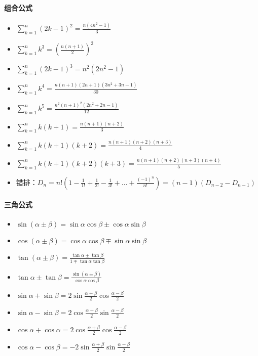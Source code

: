 \documentclass{article}
\begin{document}
\paragraph{组合公式}

\begin{itemize}
\item
  $\sum_{k=1}^{n}(2k-1)^2 = \frac{n(4n^2-1)}{3}    $
\item
  $\sum_{k=1}^{n}k^3 = (\frac{n(n+1)}{2})^2    $
\item
  $\sum_{k=1}^{n}(2k-1)^3 = n^2(2n^2-1)    $
\item
  $\sum_{k=1}^{n}k^4 = \frac{n(n+1)(2n+1)(3n^2+3n-1)}{30}  $
\item
  $\sum_{k=1}^{n}k^5 = \frac{n^2(n+1)^2(2n^2+2n-1)}{12}    $
\item
  $\sum_{k=1}^{n}k(k+1) = \frac{n(n+1)(n+2)}{3}    $
\item
  $\sum_{k=1}^{n}k(k+1)(k+2) = \frac{n(n+1)(n+2)(n+3)}{4} $
\item
  $\sum_{k=1}^{n}k(k+1)(k+2)(k+3) = \frac{n(n+1)(n+2)(n+3)(n+4)}{5} $
\item
  $\mbox{错排：}D_n = n!(1-\frac{1}{1!}+\frac{1}{2!}-\frac{1}{3!}+\ldots+\frac{(-1)^n}{n!}) = (n-1)(D_{n-2}-D_{n-1})$
\end{itemize}

\paragraph{三角公式}

\begin{itemize}
\item
  $\sin(\alpha \pm \beta) =
  \sin\alpha\cos\beta \pm \cos\alpha\sin\beta $
\item
  $\cos(\alpha \pm \beta) =
  \cos\alpha\cos\beta \mp \sin\alpha\sin\beta $
\item
  $\tan(\alpha \pm \beta) =
  \frac{\tan\alpha \pm \tan\beta}{1 \mp \tan\alpha\tan\beta} $
\item
  $\tan\alpha \pm \tan\beta =
  \frac{\sin(\alpha \pm \beta)}{\cos\alpha\cos\beta} $
\item
  $\sin\alpha+\sin\beta =
  2\sin\frac{\alpha+\beta}{2}\cos\frac{\alpha-\beta}{2} $
\item
  $\sin\alpha-\sin\beta =
  2\cos\frac{\alpha+\beta}{2}\sin\frac{\alpha-\beta}{2} $
\item
  $\cos\alpha+\cos\alpha =
  2\cos\frac{\alpha+\beta}{2}\cos\frac{\alpha-\beta}{2} $
\item
  $\cos\alpha-\cos\beta =
  -2\sin\frac{\alpha+\beta}{2}\sin\frac{\alpha-\beta}{2} $
\end{itemize}
\end{document}
